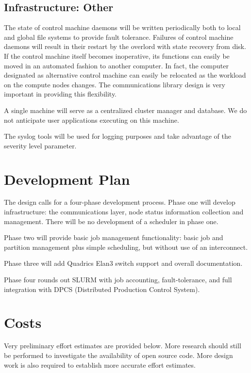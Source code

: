 \subsection{Infrastructure: Other}

The state of control machine daemons will be written periodically both to local
and global file systems to provide fault tolerance. Failures of control machine
daemons will result in their restart by the overlord with state recovery from
disk. If the control machine itself becomes inoperative, its functions can
easily be moved in an automated fashion to another computer. In fact, the
computer designated as alternative control machine can easily be relocated as
the workload on the compute nodes changes. The communications library design is
very important in providing this flexibility.

A single machine will serve as a centralized cluster manager and database. We
do not anticipate user applications executing on this machine. 

The syslog tools will be used for logging purposes and take advantage of the 
severity level parameter.

\section{Development Plan}

The design calls for a four-phase development process.  Phase one will
develop infrastructure: the communications layer, node status information 
collection and management.  There will be no development of a scheduler 
in phase one.

Phase two will provide basic job management functionality:  basic job and 
partition management plus simple scheduling, but without use of an
interconnect. 

Phase three will add Quadrics Elan3 switch support and overall documentation.  

Phase four rounds out SLURM with job accounting, fault-tolerance, 
and full integration with DPCS (Distributed Production Control System).


\section{Costs}

Very preliminary effort estimates are provided below. More research should
still be performed to investigate the availability of open source code. More
design work is also required to establish more accurate effort estimates.

